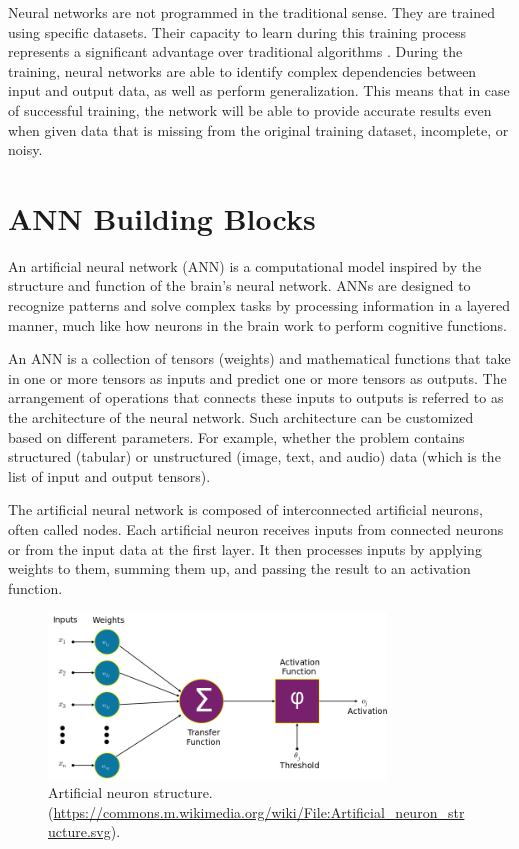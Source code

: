 Neural networks are not programmed in the traditional sense. They are trained using specific datasets. Their capacity to learn during this training process represents a significant advantage over traditional algorithms \cite{ayyadevara2024modern}. During the training, neural networks are able to identify complex dependencies between input and output data, as well as perform generalization. This means that in case of successful training, the network will be able to provide accurate results even when given data that is missing from the original training dataset, incomplete, or noisy.

\section{ANN Building Blocks}

An artificial neural network (ANN) is a computational model inspired by the structure and function of the brain's neural network. ANNs are designed to recognize patterns and solve complex tasks by processing information in a layered manner, much like how neurons in the brain work to perform cognitive functions.

An ANN is a collection of tensors (weights) and mathematical functions that take in one or more tensors as inputs and predict one or more tensors as outputs. The arrangement of operations that connects these inputs to outputs is referred to as the architecture of the neural network. Such architecture can be customized based on different parameters. For example, whether the problem contains structured (tabular) or unstructured (image, text, and audio) data (which is the list of input and output tensors).

The artificial neural network is composed of interconnected artificial neurons, often called nodes. Each artificial neuron receives inputs from connected neurons or from the input data at the first layer. It then processes inputs by applying weights to them, summing them up, and passing the result to an activation function.

\begin{figure}[htbp]
    \centering
    \includegraphics[width=0.8\textwidth]{obrazky-figures/02-theoretical-basis/Artificial_neuron_structure.png}
    \caption{Artificial neuron structure. (\url{https://commons.m.wikimedia.org/wiki/File:Artificial_neuron_structure.svg}).}
    \label{fig:neuron}
\end{figure}

